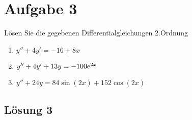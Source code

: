 \documentclass[main.tex]{subfiles}
\begin{document}
\section{Aufgabe 3}
Lösen Sie die gegebenen Differentialgleichungen 2.Ordnung
\begin{enumerate}
    \item $y'' + 4y' = -16 + 8x$
    \item $y'' + 4y' + 13y = -100\mathrm{e}^{2x}$
    \item $y'' + 24y = 84\sin(2x) + 152\cos(2x)$
\end{enumerate}

\subsection{Lösung 3}
\end{document}
